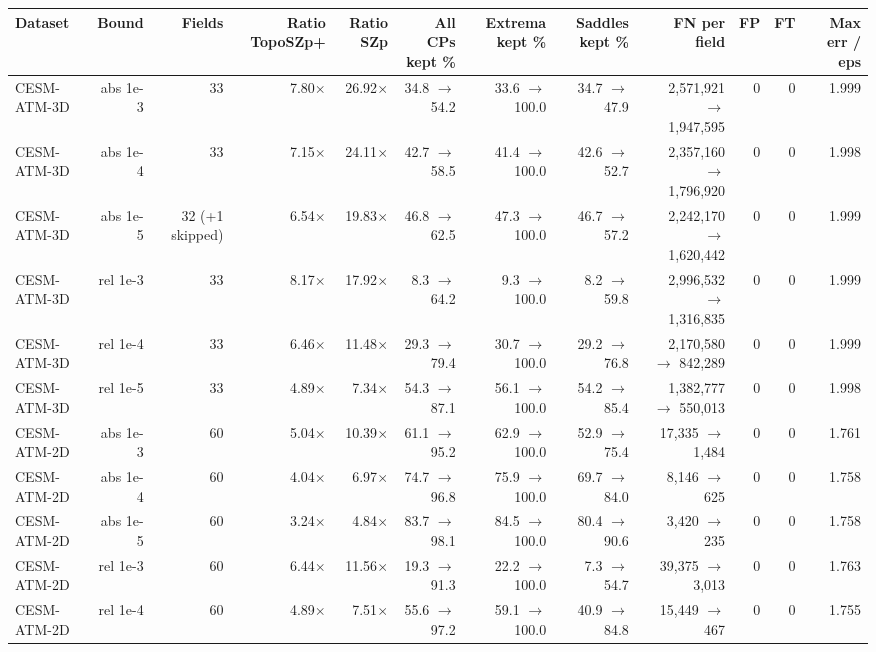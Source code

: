 \begin{tabular}{lrrrrrrrrrrr}
\toprule
\textbf{Dataset} & \textbf{Bound} & \textbf{Fields} & \textbf{Ratio TopoSZp+} & \textbf{Ratio SZp} & \textbf{All CPs kept \%} & \textbf{Extrema kept \%} & \textbf{Saddles kept \%} & \textbf{FN per field} & \textbf{FP} & \textbf{FT} & \textbf{Max err / eps} \\
\midrule
CESM-ATM-3D & abs 1e-3 & 33 & 7.80$\times$ & 26.92$\times$ & 34.8 $\to$ 54.2 & 33.6 $\to$ 100.0 & 34.7 $\to$ 47.9 & 2,571,921 $\to$ 1,947,595 & 0 & 0 & 1.999 \\
CESM-ATM-3D & abs 1e-4 & 33 & 7.15$\times$ & 24.11$\times$ & 42.7 $\to$ 58.5 & 41.4 $\to$ 100.0 & 42.6 $\to$ 52.7 & 2,357,160 $\to$ 1,796,920 & 0 & 0 & 1.998 \\
CESM-ATM-3D & abs 1e-5 & 32 (+1 skipped) & 6.54$\times$ & 19.83$\times$ & 46.8 $\to$ 62.5 & 47.3 $\to$ 100.0 & 46.7 $\to$ 57.2 & 2,242,170 $\to$ 1,620,442 & 0 & 0 & 1.999 \\
CESM-ATM-3D & rel 1e-3 & 33 & 8.17$\times$ & 17.92$\times$ & 8.3 $\to$ 64.2 & 9.3 $\to$ 100.0 & 8.2 $\to$ 59.8 & 2,996,532 $\to$ 1,316,835 & 0 & 0 & 1.999 \\
CESM-ATM-3D & rel 1e-4 & 33 & 6.46$\times$ & 11.48$\times$ & 29.3 $\to$ 79.4 & 30.7 $\to$ 100.0 & 29.2 $\to$ 76.8 & 2,170,580 $\to$ 842,289 & 0 & 0 & 1.999 \\
CESM-ATM-3D & rel 1e-5 & 33 & 4.89$\times$ & 7.34$\times$ & 54.3 $\to$ 87.1 & 56.1 $\to$ 100.0 & 54.2 $\to$ 85.4 & 1,382,777 $\to$ 550,013 & 0 & 0 & 1.998 \\
CESM-ATM-2D & abs 1e-3 & 60 & 5.04$\times$ & 10.39$\times$ & 61.1 $\to$ 95.2 & 62.9 $\to$ 100.0 & 52.9 $\to$ 75.4 & 17,335 $\to$ 1,484 & 0 & 0 & 1.761 \\
CESM-ATM-2D & abs 1e-4 & 60 & 4.04$\times$ & 6.97$\times$ & 74.7 $\to$ 96.8 & 75.9 $\to$ 100.0 & 69.7 $\to$ 84.0 & 8,146 $\to$ 625 & 0 & 0 & 1.758 \\
CESM-ATM-2D & abs 1e-5 & 60 & 3.24$\times$ & 4.84$\times$ & 83.7 $\to$ 98.1 & 84.5 $\to$ 100.0 & 80.4 $\to$ 90.6 & 3,420 $\to$ 235 & 0 & 0 & 1.758 \\
CESM-ATM-2D & rel 1e-3 & 60 & 6.44$\times$ & 11.56$\times$ & 19.3 $\to$ 91.3 & 22.2 $\to$ 100.0 & 7.3 $\to$ 54.7 & 39,375 $\to$ 3,013 & 0 & 0 & 1.763 \\
CESM-ATM-2D & rel 1e-4 & 60 & 4.89$\times$ & 7.51$\times$ & 55.6 $\to$ 97.2 & 59.1 $\to$ 100.0 & 40.9 $\to$ 84.8 & 15,449 $\to$ 467 & 0 & 0 & 1.755 \\

\end{tabular}

